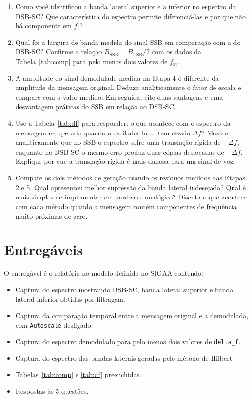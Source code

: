 \documentclass[11pt,a4paper]{article}
\begin{document}
\begin{enumerate}[label=\textbf{Q\arabic*.}, leftmargin=*]

  \item Como você identificou a banda lateral superior e a inferior no
    espectro do DSB-SC? Que característica do espectro permite diferenciá-las
    e por que não há componente em $f_c$?

  \item Qual foi a largura de banda medida do sinal SSB em comparação com a do
    DSB-SC? Confirme a relação $B_\text{SSB} = B_\text{DSB}/2$ com os dados da
    Tabela~\ref{tab:comp} para pelo menos dois valores de $f_m$.

  \item A amplitude do sinal demodulado medida na Etapa 4 é diferente da
    amplitude da mensagem original. Deduza analiticamente o fator de escala e
    compare com o valor medido. Em seguida, cite duas vantagens e uma
    desvantagem práticas do SSB em relação ao DSB-SC.

  \item Use a Tabela~\ref{tab:df} para responder: o que acontece com o
    espectro da mensagem recuperada quando o oscilador local tem desvio
    $\Delta f$? Mostre analiticamente que no SSB o espectro sofre uma
    translação rígida de $-\Delta f$, enquanto no DSB-SC o mesmo erro produz
    duas cópias deslocadas de $\pm\Delta f$. Explique por que a translação
    rígida é mais danosa para um sinal de voz.

  \item Compare os dois métodos de geração usando os resíduos medidos nas
    Etapas 2 e 5. Qual apresentou melhor supressão da banda lateral
    indesejada? Qual é mais simples de implementar em hardware analógico?
    Discuta o que acontece com cada método quando a mensagem contém
    componentes de frequência muito próximas de zero.

\end{enumerate}

\section{Entregáveis}

O entregável é o relatório no modelo definido no SIGAA contendo:

\begin{itemize}
  \item Captura do espectro mostrando DSB-SC, banda lateral superior e banda
    lateral inferior obtidas por filtragem.
  \item Captura da comparação temporal entre a mensagem original e a
    demodulada, com \texttt{Autoscale} desligado.
  \item Captura do espectro demodulado para pelo menos dois valores de
    \texttt{delta\_f}.
  \item Captura do espectro das bandas laterais geradas pelo método de Hilbert.
  \item Tabelas~\ref{tab:comp} e \ref{tab:df} preenchidas.
  \item Respostas às 5 questões.
\end{itemize}
\end{document}
